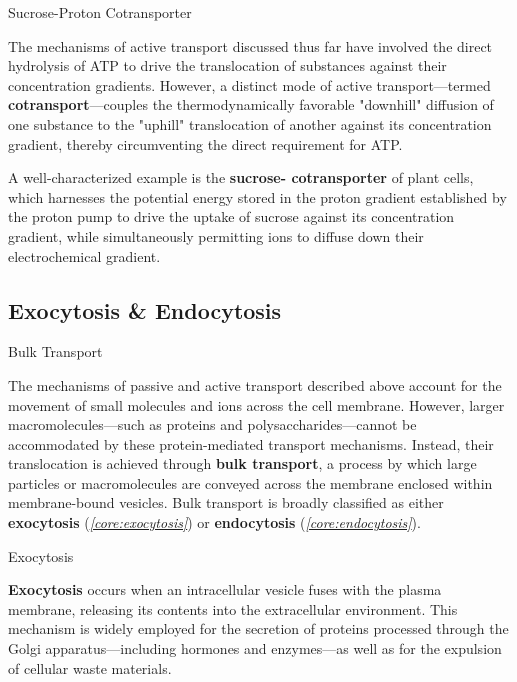 \documentclass[10pt]{article}
\begin{document}
    \begin{core}{Sucrose-Proton Cotransporter}

      The mechanisms of active transport discussed thus far have involved the direct hydrolysis of ATP to drive the translocation of substances against their concentration gradients. However, a distinct mode of active transport---termed \textbf{cotransport}---couples the thermodynamically favorable "downhill" diffusion of one substance to the "uphill" translocation of another against its concentration gradient, thereby circumventing the direct requirement for ATP.

      A well-characterized example is the \textbf{sucrose- cotransporter} of plant cells, which harnesses the potential energy stored in the proton gradient established by the proton pump to drive the uptake of sucrose against its concentration gradient, while simultaneously permitting  ions to diffuse down their electrochemical gradient.


    \end{core}

  \subsection{Exocytosis \& Endocytosis}

    \begin{core}{Bulk Transport}

      The mechanisms of passive and active transport described above account for the movement of small molecules and ions across the cell membrane. However, larger macromolecules---such as proteins and polysaccharides---cannot be accommodated by these protein-mediated transport mechanisms. Instead, their translocation is achieved through \textbf{bulk transport}, a process by which large particles or macromolecules are conveyed across the membrane enclosed within membrane-bound vesicles. Bulk transport is broadly classified as either \textbf{exocytosis} (\textit{\autoref{core:exocytosis}}) or \textbf{endocytosis} (\textit{\autoref{core:endocytosis}}).

    \end{core}

    \begin{core}[label=core:exocytosis]{Exocytosis}

      \textbf{Exocytosis} occurs when an intracellular vesicle fuses with the plasma membrane, releasing its contents into the extracellular environment. This mechanism is widely employed for the secretion of proteins processed through the Golgi apparatus---including hormones and enzymes---as well as for the expulsion of cellular waste materials.


    \end{core}
\end{document}
